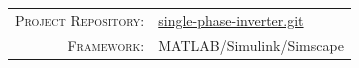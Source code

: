 \documentclass[12pt,a4paper]{scrartcl}
\newcommand{\MetaLabelA}{Project Repository}
\newcommand{\MetaValueA}{https://github.com/pwr-control/single-phase-inverter.git}
\newcommand{\MetaValueAUrl}{https://github.com/pwr-control/single-phase-inverter.git}
\newcommand{\MetaValueALabel}{single-phase-inverter.git}
\newcommand{\MetaLabelB}{Framework}
\newcommand{\MetaValueB}{MATLAB/Simulink/Simscape}
\newcommand{\MetaLabelC}{Architecture}
\newcommand{\MetaValueC}{SiC, EiceDRIVER, Customized Power Supplies}
\begin{document}
	\vfill
	
	\noindent
	\begin{tabular}{@{} r @{\quad} l @{}}
		\textsc{\MetaLabelA:} & {\href{\MetaValueAUrl}{\MetaValueALabel}} \\[3pt]
		\textsc{\MetaLabelB:} & {\MetaValueB}       \\[3pt]
	\end{tabular}
	
	\newpage
	\setcounter{page}{1}
	\tableofcontents
	\listoffigures	
	\listoftables
	\newpage
	
\end{document}
